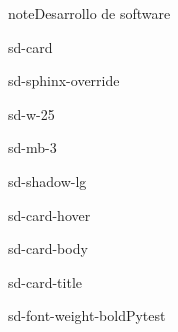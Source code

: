 \documentclass[letterpaper,10pt,spanish]{sphinxmanual}
\begin{document}
\begin{sphinxadmonition}{note}{Desarrollo de software}
\begin{itemize}
\begin{sphinxuseclass}{sd-card}
\begin{sphinxuseclass}{sd-sphinx-override}
\begin{sphinxuseclass}{sd-w-25}
\begin{sphinxuseclass}{sd-mb-3}
\begin{sphinxuseclass}{sd-shadow-lg}
\begin{sphinxuseclass}{sd-card-hover}
\begin{sphinxuseclass}{sd-card-body}
\begin{sphinxuseclass}{sd-card-title}
\begin{sphinxuseclass}{sd-font-weight-bold}Pytest
\end{sphinxuseclass}
\end{sphinxuseclass}
\end{sphinxuseclass}
\noindent{}
\end{sphinxuseclass}
\end{sphinxuseclass}
\end{sphinxuseclass}
\end{sphinxuseclass}
\end{sphinxuseclass}
\end{sphinxuseclass}
\end{itemize}
\end{sphinxadmonition}
\end{document}
